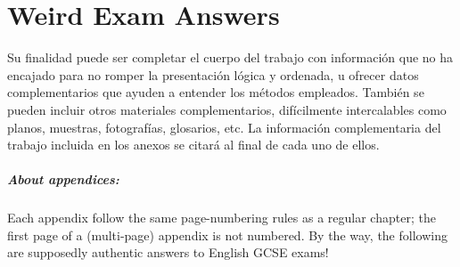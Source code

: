 \chapter{Weird Exam Answers}	%

Su finalidad puede ser completar el cuerpo del trabajo con información que no ha encajado para no romper la presentación lógica y ordenada, u ofrecer datos complementarios que ayuden a entender los métodos empleados. También se pueden incluir otros materiales complementarios, difícilmente intercalables como planos, muestras, fotografías, glosarios, etc. La información complementaria del trabajo incluida en los anexos se citará al final de cada uno de ellos.

\paragraph{About appendices:}
	Each appendix follow the same page-numbering rules
	as a regular chapter; the first page of a
	(multi-page) appendix is not numbered.
	By the way, the following are supposedly
	authentic answers to English GCSE exams!


